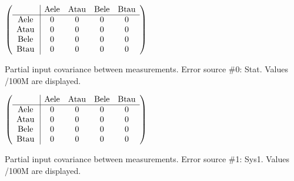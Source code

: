 \begin{table}[H]
\scriptsize
\begin{center}
\renewcommand{\arraystretch}{1.1}
\begin{math}\left(\begin{array}{c|cccc}
 & \mathrm{Aele} & 
\mathrm{Atau} & 
\mathrm{Bele} & 
\mathrm{Btau} \\
\hline
\mathrm{Aele} \hspace*{2pt} &  0 &  0 &  0 &  0 \\
\mathrm{Atau} \hspace*{2pt} &  0 &  0 &  0 &  0 \\
\mathrm{Bele} \hspace*{2pt} &  0 &  0 &  0 &  0 \\
\mathrm{Btau} \hspace*{2pt} &  0 &  0 &  0 &  0 \\
\end{array}\right)\end{math}
\caption{Partial input covariance between measurements. Error source \#0: Stat. Values /100M are displayed.}
\renewcommand{\arraystretch}{1}
\end{center}
\end{table}
\begin{table}[H]
\scriptsize
\begin{center}
\renewcommand{\arraystretch}{1.1}
\begin{math}\left(\begin{array}{c|cccc}
 & \mathrm{Aele} & 
\mathrm{Atau} & 
\mathrm{Bele} & 
\mathrm{Btau} \\
\hline
\mathrm{Aele} \hspace*{2pt} &  0 &  0 &  0 &  0 \\
\mathrm{Atau} \hspace*{2pt} &  0 &  0 &  0 &  0 \\
\mathrm{Bele} \hspace*{2pt} &  0 &  0 &  0 &  0 \\
\mathrm{Btau} \hspace*{2pt} &  0 &  0 &  0 &  0 \\
\end{array}\right)\end{math}
\caption{Partial input covariance between measurements. Error source \#1: Sys1. Values /100M are displayed.}
\renewcommand{\arraystretch}{1}
\end{center}
\end{table}
